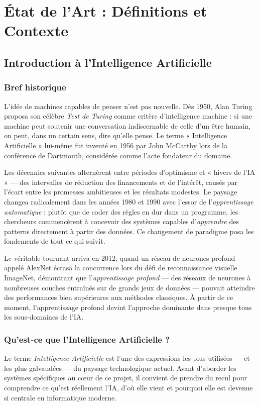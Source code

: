 \documentclass[a4paper,11pt]{article}
\begin{document}
\newpage
\section{État de l'Art : Définitions et Contexte}

\subsection{Introduction à l'Intelligence Artificielle}

\subsubsection{Bref historique}
L'idée de machines capables de penser n'est pas nouvelle. Dès 1950, Alan
Turing proposa son célèbre \emph{Test de Turing} comme critère d'intelligence
machine \cite{turing1950computing} : si une machine peut soutenir une
conversation indiscernable de celle d'un être humain, on peut, dans un certain
sens, dire qu'elle pense. Le terme « Intelligence Artificielle » lui-même fut
inventé en 1956 par John McCarthy lors de la conférence de Dartmouth,
considérée comme l'acte fondateur du domaine.

Les décennies suivantes alternèrent entre périodes d'optimisme et
« hivers de l'IA » --- des intervalles de réduction des financements et de
l'intérêt, causés par l'écart entre les promesses ambitieuses et les résultats
modestes. Le paysage changea radicalement dans les années 1980 et 1990 avec
l'essor de l'\emph{apprentissage automatique} : plutôt que de coder des règles
en dur dans un programme, les chercheurs commencèrent à concevoir des systèmes
capables d'\emph{apprendre} des patterns directement à partir des données.
Ce changement de paradigme posa les fondements de tout ce qui suivit.

Le véritable tournant arriva en 2012, quand un réseau de neurones profond
appelé AlexNet \cite{krizhevsky2012alexnet} écrasa la concurrence lors du défi
de reconnaissance visuelle ImageNet, démontrant que l'\emph{apprentissage
profond} --- des réseaux de neurones à nombreuses couches entraînés sur de
grands jeux de données --- pouvait atteindre des performances bien supérieures
aux méthodes classiques. À partir de ce moment, l'apprentissage profond
devint l'approche dominante dans presque tous les sous-domaines de l'IA.

\subsubsection{Qu'est-ce que l'Intelligence Artificielle ?}
Le terme \emph{Intelligence Artificielle} est l'une des expressions les plus
utilisées --- et les plus galvaudées --- du paysage technologique actuel. Avant
d'aborder les systèmes spécifiques au cœur de ce projet, il convient de
prendre du recul pour comprendre ce qu'est réellement l'IA, d'où elle vient
et pourquoi elle est devenue si centrale en informatique moderne.
\end{document}
